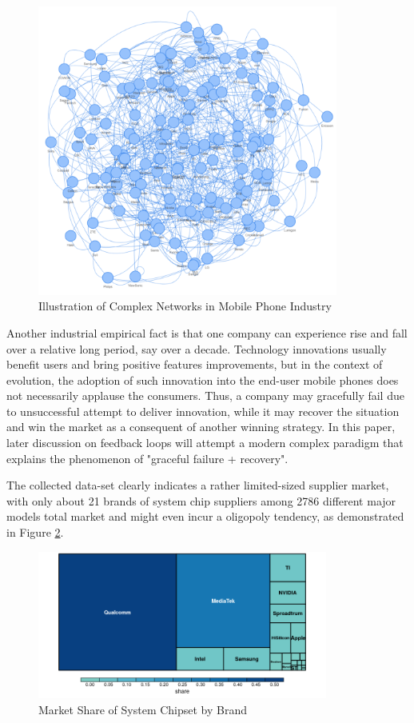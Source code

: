 \documentclass[utf8,english]{gradu3}
\begin{document}
\begin{figure}[htb]
    \centering
    \includegraphics[width=0.88\textwidth]{network.png}
    \caption{Illustration of Complex Networks in Mobile Phone Industry}
    \label{fig:networks}
\end{figure}

Another industrial empirical fact is that one company can experience rise and fall over a relative long period, say over a decade. Technology innovations usually benefit users and bring positive features improvements, but in the context of evolution, the adoption of such innovation into the end-user mobile phones does not necessarily applause the consumers. Thus, a company may gracefully fail due to unsuccessful attempt to deliver innovation, while it may recover the situation and win the market as a consequent of another winning strategy. In this paper, later discussion on feedback loops will attempt a modern complex paradigm that explains the phenomenon of "graceful failure + recovery".

The collected data-set clearly indicates a rather limited-sized supplier market, with only about 21 brands of system chip suppliers among 2786 different major models total market and might even incur a oligopoly tendency, as demonstrated in Figure \ref{fig:systemchip}.

\begin{figure}[htb]
    \centering
    \includegraphics[width=0.85\textwidth]{systemchip.png}
    \caption{Market Share of System Chipset by Brand}
    \label{fig:systemchip}
\end{figure}
\end{document}
